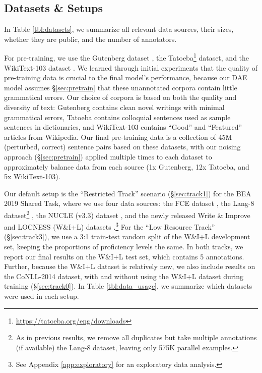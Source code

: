 \documentclass[11pt,a4paper]{article}
\begin{document}
\subsection{Datasets \& Setups}\label{sec:datasets}

In Table \ref{tbl:datasets}, we summarize all relevant data sources, their sizes, whether they are public, and the number of annotators.

For pre-training, we use the Gutenberg dataset \cite{lahiri2014complexity}, the Tatoeba\footnote{\url{https://tatoeba.org/eng/downloads}} dataset, and the WikiText-103 dataset \cite{merity2016pointer}. 
We learned through initial experiments that the quality of pre-training data is crucial to the final model's performance, because our DAE model assumes \S\ref{sec:pretrain} that these unannotated corpora contain little grammatical errors. 
Our choice of corpora is based on both the quality and diversity of text: Gutenberg contains clean novel writings with minimal grammatical errors, Tatoeba contains colloquial sentences used as sample sentences in dictionaries, and WikiText-103 contains ``Good'' and ``Featured'' articles from Wikipedia.
Our final pre-training data is a collection of 45M (perturbed, correct) sentence pairs based on these datasets, with our noising approach (\S\ref{sec:pretrain}) applied multiple times to each dataset to approximately balance data from each source (1x Gutenberg, 12x Tatoeba, and 5x WikiText-103). 

Our default setup is the ``Restricted Track'' scenario (\S\ref{sec:track1}) for the BEA 2019 Shared Task, where we use four data sources: the FCE dataset \cite{bea2019}, the Lang-8 dataset\footnote{As in previous results, we remove all duplicates but take multiple annotations (if available) the Lang-8 dataset, leaving only 575K parallel examples.} \cite{mizumoto2011mining,tajiri2012tense}, the NUCLE (v3.3) dataset \cite{dahlmeier2013building}, and the newly released Write \& Improve and LOCNESS (W\&I+L) datasets \cite{yannakoudakis2018developing}.\footnote{See Appendix \ref{app:exploratory} for an exploratory data analysis.}
For the ``Low Resource Track'' (\S\ref{sec:track3}), we use a 3:1 train-test random split of the W\&I+L development set, keeping the proportions of proficiency levels the same. 
In both tracks, we report our final results on the W\&I+L test set, which contains 5 annotations.
Further, because the W\&I+L dataset is relatively new, we also include results on the CoNLL-2014 \cite{ng2014conll} dataset, with and without using the W\&I+L dataset during training  (\S\ref{sec:track0}).
In Table \ref{tbl:data_usage}, we summarize which datasets were used in each setup.
\end{document}
